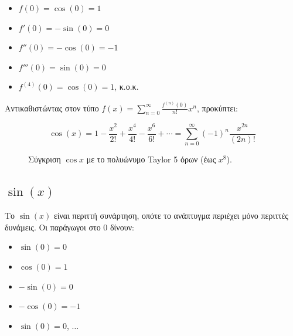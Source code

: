 \documentclass[a4paper, 11pt]{article}
\providecommand{\tightlist}{\setlength{\itemsep}{0pt}\setlength{\parskip}{0pt}}
\begin{document}
\begin{itemize}
\tightlist
\item
  \(f(0) = \cos(0) = 1\)
\item
  \(f'(0) = -\sin(0) = 0\)
\item
  \(f''(0) = -\cos(0) = -1\)
\item
  \(f'''(0) = \sin(0) = 0\)
\item
  \(f^{(4)}(0) = \cos(0) = 1\), κ.ο.κ.
\end{itemize}

Αντικαθιστώντας στον τύπο
\(f(x)=\sum_{n=0}^{\infty} \frac{f^{(n)}(0)}{n!}x^n\), προκύπτει:

\[
\cos(x) = 1 - \frac{x^2}{2!} + \frac{x^4}{4!} - \frac{x^6}{6!} + \cdots = \sum_{n=0}^{\infty} (-1)^n \frac{x^{2n}}{(2n)!}
\]

\begin{figure}[htbp]
\centering
{}
\caption{Σύγκριση $\cos x$ με το πολυώνυμο Taylor 5 όρων (έως $x^8$).}
\label{fig:costaylor5}
\end{figure}

\subsection{\texorpdfstring{\(\sin(x)\)}{\textbackslash sin(x)}}\label{sinx}

Το \(\sin(x)\) είναι περιττή συνάρτηση, οπότε το ανάπτυγμα περιέχει μόνο
περιττές δυνάμεις. Οι παράγωγοι στο \(0\) δίνουν:

\begin{itemize}
\tightlist
\item
  \(\sin(0)=0\)
\item
  \(\cos(0)=1\)
\item
  \(-\sin(0)=0\)
\item
  \(-\cos(0)=-1\)
\item
  \(\sin(0)=0\), \(\dots\)
\end{itemize}
\end{document}
